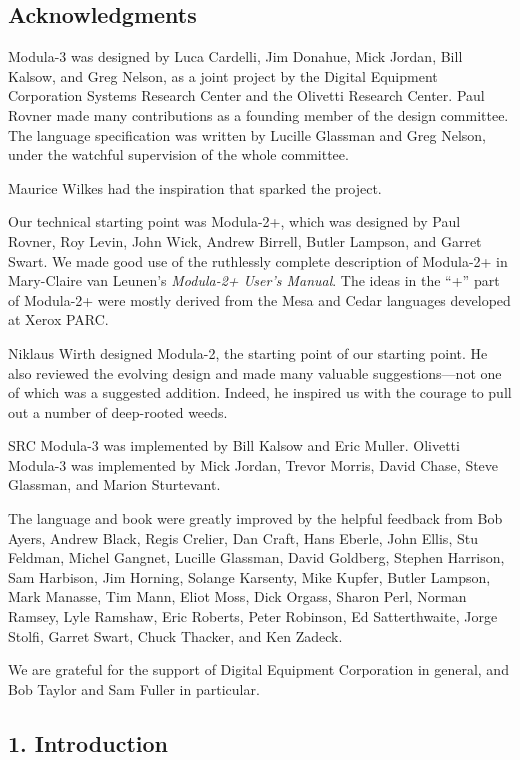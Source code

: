\documentclass[10pt]{article}
\begin{document}
\subsection*{Acknowledgments}

Modula-3 was designed by Luca Cardelli, Jim Donahue, Mick Jordan, Bill Kalsow,
and Greg Nelson, as a joint project by the Digital Equipment Corporation
Systems Research Center and the Olivetti Research Center.  Paul Rovner made
many contributions as a founding member of the design committee.  The language
specification was written by Lucille Glassman and Greg Nelson, under the
watchful supervision of the whole committee.

Maurice Wilkes had the inspiration that sparked the project.

Our technical starting point was Modula-2+, which was designed by Paul Rovner,
Roy Levin, John Wick, Andrew Birrell, Butler Lampson, and Garret Swart.  We
made good use of the ruthlessly complete description of Modula-2+ in
Mary-Claire van Leunen's \emph{Modula-2+ User's Manual}.  The ideas in the
``+'' part of Modula-2+ were mostly derived from the Mesa and Cedar languages
developed at Xerox PARC.

Niklaus Wirth designed Modula-2, the starting point of our starting point.  He
also reviewed the evolving design and made many valuable suggestions---not one
of which was a suggested addition.  Indeed, he inspired us with the courage to
pull out a number of deep-rooted weeds.

SRC Modula-3 was implemented by Bill Kalsow and Eric Muller.  Olivetti
Modula-3 was implemented by Mick Jordan, Trevor Morris, David Chase, Steve
Glassman, and Marion Sturtevant.

The language and book were greatly improved by the helpful feedback from Bob
Ayers, Andrew Black, Regis Crelier, Dan Craft, Hans Eberle, John Ellis, Stu
Feldman, Michel Gangnet, Lucille Glassman, David Goldberg, Stephen Harrison,
Sam Harbison, Jim Horning, Solange Karsenty, Mike Kupfer, Butler Lampson, Mark
Manasse, Tim Mann, Eliot Moss, Dick Orgass, Sharon Perl, Norman Ramsey, Lyle
Ramshaw, Eric Roberts, Peter Robinson, Ed Satterthwaite, Jorge Stolfi, Garret
Swart, Chuck Thacker, and Ken Zadeck.

We are grateful for the support of Digital Equipment Corporation in general,
and Bob Taylor and Sam Fuller in particular.

\subsection*{1. Introduction}
\end{document}
